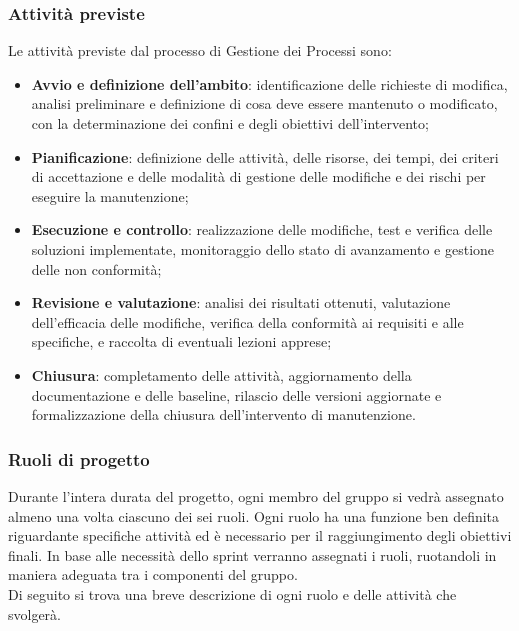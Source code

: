 \documentclass[a4paper,12pt]{article}
\begin{document}
        \subsubsection{Attività previste}
            Le attività previste dal processo di Gestione dei Processi sono:
            \begin{itemize}
                \item \textbf{Avvio e definizione dell'ambito}: identificazione delle richieste di modifica, analisi preliminare e definizione di cosa deve essere mantenuto o modificato, con la determinazione dei confini e degli obiettivi dell'intervento;
                \item \textbf{Pianificazione}: definizione delle attività, delle risorse, dei tempi, dei criteri di accettazione e delle modalità di gestione delle modifiche e dei rischi per eseguire la manutenzione;
                \item \textbf{Esecuzione e controllo}: realizzazione delle modifiche, test e verifica delle soluzioni implementate, monitoraggio dello stato di avanzamento e gestione delle non conformità;
                \item \textbf{Revisione e valutazione}: analisi dei risultati ottenuti, valutazione dell'efficacia delle modifiche, verifica della conformità ai requisiti e alle specifiche, e raccolta di eventuali lezioni apprese;
                \item \textbf{Chiusura}: completamento delle attività, aggiornamento della documentazione e delle baseline, rilascio delle versioni aggiornate e formalizzazione della chiusura dell'intervento di manutenzione.
            \end{itemize}

        \subsubsection{Ruoli di progetto}
            Durante l'intera durata del progetto, ogni membro del gruppo si vedrà assegnato almeno una volta ciascuno dei sei ruoli.
            Ogni ruolo ha una funzione ben definita riguardante specifiche attività ed è necessario per il raggiungimento degli obiettivi finali.
            In base alle necessità dello sprint verranno assegnati i ruoli, ruotandoli in maniera adeguata tra i componenti del gruppo.\\
            Di seguito si trova una breve descrizione di ogni ruolo e delle attività che svolgerà.
\end{document}
